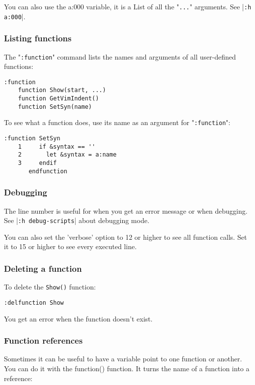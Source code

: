 You can also use the a:000 variable, it is a List of all the "\verb!...!" arguments.
See |\verb!:h a:000!|.

\subsubsection{Listing functions}
The "\verb!:function!" command lists the names and arguments of all user-defined
functions:

\begin{Verbatim}[samepage=true]
 :function
    function Show(start, ...)
    function GetVimIndent()
    function SetSyn(name)
\end{Verbatim}

To see what a function does, use its name as an argument for "\verb!:function!":

\begin{Verbatim}[samepage=true]
 :function SetSyn
    1     if &syntax == ''
    2       let &syntax = a:name
    3     endif
       endfunction
\end{Verbatim}

\subsubsection{Debugging}
The line number is useful for when you get an error message or when debugging.
See |\verb!:h debug-scripts!| about debugging mode.

You can also set the 'verbose' option to 12 or higher to see all function calls.
Set it to 15 or higher to see every executed line.

\subsubsection{Deleting a function}
To delete the \verb!Show()! function:

\begin{Verbatim}[samepage=true]
 :delfunction Show
\end{Verbatim}

You get an error when the function doesn't exist.

\subsubsection{Function references}
Sometimes it can be useful to have a variable point to one function or another.
You can do it with the function() function.
It turns the name of a function into a reference:

